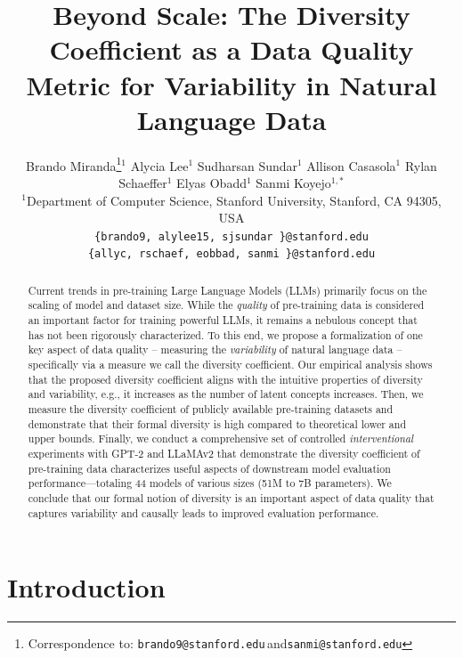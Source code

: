 \documentclass[10pt]{article} %
\title{Beyond Scale: The Diversity Coefficient as a Data Quality Metric for Variability in Natural Language Data}
\author{%
Brando Miranda\thanks{Correspondence to: \texttt{brando9@stanford.edu}\,\;and\;\texttt{sanmi@stanford.edu}}\space\space$^{1}$
\And
Alycia Lee$^{1}$
\And
Sudharsan Sundar$^{1}$
\AND
Allison Casasola$^{1}$
\And
Rylan Schaeffer$^{1}$
\And
Elyas Obadd$^{1}$
\AND
Sanmi Koyejo$^{1,*}$
\\[0.8em]
$^{1}$Department of Computer Science, Stanford University, Stanford, CA 94305, USA\\
\texttt{\{brando9, alylee15, sjsundar \}@stanford.edu}\\
\texttt{\{allyc, rschaef, eobbad, sanmi \}@stanford.edu}
}
\begin{document}
\maketitle

\begin{abstract}
Current trends in pre-training Large Language Models (LLMs) primarily focus on the scaling of model and dataset size.
While the \textit{quality} of pre-training data is considered an important factor for training powerful LLMs, it remains a nebulous concept that has not been rigorously characterized.
To this end, we propose a formalization of one key aspect of data quality -- measuring the \textit{variability} of natural language data -- specifically via a measure we call the diversity coefficient. 
Our empirical analysis shows that the proposed diversity coefficient aligns with the intuitive properties of diversity and variability,
e.g., it increases as the number of latent concepts increases. 
Then, we measure the diversity coefficient of publicly available pre-training datasets and demonstrate that their formal diversity is high compared to theoretical lower and upper bounds.
Finally, we conduct a comprehensive set of controlled \textit{interventional} experiments with GPT-2 and LLaMAv2 that demonstrate the diversity coefficient of pre-training data characterizes useful aspects of downstream model evaluation performance---totaling 44 models of various sizes (51M  to 7B parameters).
We conclude that our formal notion of diversity is an important aspect of data quality that captures variability and causally leads to improved evaluation performance.
\end{abstract}

\section{Introduction}
\end{document}
